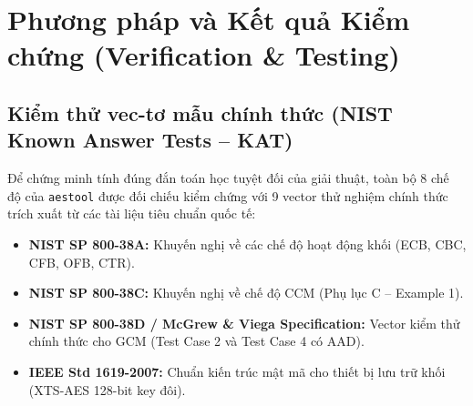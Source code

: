 \documentclass[12pt, a4paper]{report}
\begin{document}
\section{Phương pháp và Kết quả Kiểm chứng (Verification \& Testing)}
\label{sec:testing}

\subsection{Kiểm thử vec-tơ mẫu chính thức (NIST Known Answer Tests -- KAT)}
Để chứng minh tính đúng đắn toán học tuyệt đối của giải thuật, toàn bộ 8 chế độ của \texttt{aestool} được đối chiếu kiểm chứng với 9 vector thử nghiệm chính thức trích xuất từ các tài liệu tiêu chuẩn quốc tế:
\begin{itemize}
    \item \textbf{NIST SP 800-38A:} Khuyến nghị về các chế độ hoạt động khối (ECB, CBC, CFB, OFB, CTR).
    \item \textbf{NIST SP 800-38C:} Khuyến nghị về chế độ CCM (Phụ lục C -- Example 1).
    \item \textbf{NIST SP 800-38D / McGrew \& Viega Specification:} Vector kiểm thử chính thức cho GCM (Test Case 2 và Test Case 4 có AAD).
    \item \textbf{IEEE Std 1619-2007:} Chuẩn kiến trúc mật mã cho thiết bị lưu trữ khối (XTS-AES 128-bit key đôi).
\end{itemize}
\end{document}
